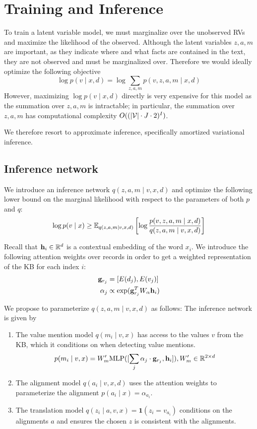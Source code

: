 \documentclass[12pt]{article}
\begin{document}
\section{Training and Inference}
To train a latent variable model, we must marginalize over the unobserved RVs
and maximize the likelihood of the observed.
Although the latent variables $z,a,m$ are important, as they indicate
where and what facts are contained in the text, they are not observed
and must be marginalized over.
Therefore we would ideally optimize the following objective
\begin{equation}
\log p(v \mid x,d) = \log \sum_{z,a,m} p(v,z,a,m \mid x,d)
\end{equation}
However, maximizing $\log p(v \mid x,d)$ directly is very expensive for this model
as the summation over $z,a,m$ is intractable;
in particular,
the summation over $z,a,m$ has computational complexity $O((|\mathcal{V}|\cdot J\cdot 2)^{I})$.

We therefore resort to approximate inference,
specifically amortized variational inference.

\subsection{Inference network}
We introduce an inference network $q(z,a,m\mid v,x,d)$
and optimize the following lower bound on the marginal likelihood
with respect to the parameters of both $p$ and $q$:
\begin{equation}
\label{eqn:lowerbound}
\log p(v\mid x) \geq
\mathbb{E}_{q(z,a,m\mid v,x,d)}\left[\log \frac{p(v,z,a,m\mid x,d)}{q(z,a,m\mid v,x,d)}\right]
\end{equation}


Recall that $\mathbf{h}_i \in \mathbb{R}^d$ is a contextual embedding of the word $x_i$.
We introduce the following attention weights over records
in order to get a weighted representation
of the KB for each index $i$:
\begin{align}
\mathbf{g}_{r_j} &= [E(d_j), E(v_j)]\\
\alpha_j &\propto \exp(\mathbf{g}_{r_j}^T W_\alpha \mathbf{h}_i)
\end{align}

We propose to parameterize $q(z,a,m\mid v,x,d)$ as follows:
The inference network is given by
\begin{enumerate}
\item The value mention model $q(m_i \mid v,x)$ 
    has access to the values $v$ from the KB, which it conditions on
    when detecting value mentions. 
    $$p(m_i \mid v,x) = W_m' \textrm{MLP}([\sum_j \alpha_j \cdot \mathbf{g}_{r_j}, \mathbf{h}_i]), W'_m \in \mathbb{R}^{2 \times d}$$
\item The alignment model $q(a_i \mid v,x,d)$
    uses the attention weights to parameterize the alignment
    $p(a_i \mid x) = \alpha_{a_i}$.
\item The translation model $q(z_i \mid a,v,x) = \mathbf{1}(z_i = v_{a_i})$
    conditions on the alignments $a$ and ensures the chosen $z$ is consistent
    with the alignments. 
\end{enumerate}
\end{document}
